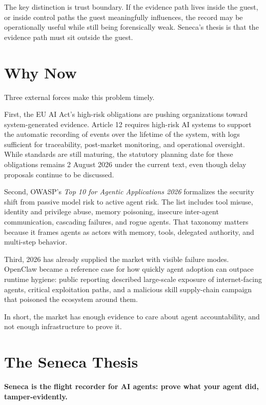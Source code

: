 \documentclass[11pt]{article}
\begin{document}
The key distinction is trust boundary. If the evidence path lives inside the guest, or inside control paths the guest meaningfully influences, the record may be operationally useful while still being forensically weak. Seneca's thesis is that the evidence path must sit outside the guest.

\section{Why Now}

Three external forces make this problem timely.

First, the EU AI Act's high-risk obligations are pushing organizations toward system-generated evidence. Article 12 requires high-risk AI systems to support the automatic recording of events over the lifetime of the system, with logs sufficient for traceability, post-market monitoring, and operational oversight.\cite{euarticle12} While standards are still maturing, the statutory planning date for these obligations remains 2 August 2026 under the current text, even though delay proposals continue to be discussed.\cite{helpnet}

Second, OWASP's \emph{Top 10 for Agentic Applications 2026} formalizes the security shift from passive model risk to active agent risk. The list includes tool misuse, identity and privilege abuse, memory poisoning, insecure inter-agent communication, cascading failures, and rogue agents.\cite{owaspagentic} That taxonomy matters because it frames agents as actors with memory, tools, delegated authority, and multi-step behavior.

Third, 2026 has already supplied the market with visible failure modes. OpenClaw became a reference case for how quickly agent adoption can outpace runtime hygiene: public reporting described large-scale exposure of internet-facing agents, critical exploitation paths, and a malicious skill supply-chain campaign that poisoned the ecosystem around them.\cite{bitdefenderopenclaw,ibmopenclaw}

In short, the market has enough evidence to care about agent accountability, and not enough infrastructure to prove it.

\section{The Seneca Thesis}

\textbf{Seneca is the flight recorder for AI agents: prove what your agent did, tamper-evidently.}
\end{document}
